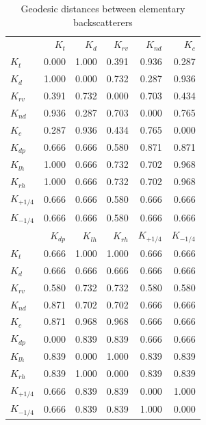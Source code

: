 \documentclass[conference]{IEEEtran}
\begin{document}
\begin{table}[hbt]
\centering
\caption{Geodesic distances between elementary backscatterers}\label{tab:dist_matrix}
\begin{tabular}{lrrrrr}
\toprule
& $K_{t}$ & $K_{d}$ & $K_{rv}$ & $K_{nd}$ & $K_{c}$\\
\cmidrule(lr){2-6}
$K_{t}$ & 0.000 & 1.000 & 0.391 & 0.936 & 0.287\\
$K_{d}$ & 1.000 & 0.000 & 0.732 & 0.287 & 0.936\\
$K_{rv}$ & 0.391 & 0.732 & 0.000 & 0.703 & 0.434\\
$K_{nd}$ & 0.936 & 0.287 & 0.703 & 0.000 & 0.765\\
$K_{c}$ & 0.287 & 0.936 & 0.434 & 0.765 & 0.000\\
$K_{dp}$ & 0.666 & 0.666 & 0.580 & 0.871 & 0.871\\
$K_{lh}$ & 1.000 & 0.666 & 0.732 & 0.702 & 0.968\\
$K_{rh}$ & 1.000 & 0.666 & 0.732 & 0.702 & 0.968\\
$K_{+1/4}$ & 0.666 & 0.666 & 0.580 & 0.666 & 0.666\\
$K_{-1/4}$ & 0.666 & 0.666 & 0.580 & 0.666 & 0.666\\
\midrule
& $K_{dp}$ & $K_{lh}$ & $K_{rh}$ & $K_{+1/4}$ & $K_{-1/4}$\\
\cmidrule(lr){2-6}
$K_{t}$ & 0.666 & 1.000 & 1.000 & 0.666 & 0.666\\
$K_{d}$ & 0.666 & 0.666 & 0.666 & 0.666 & 0.666\\
$K_{rv}$ & 0.580 & 0.732 & 0.732 & 0.580 & 0.580\\
$K_{nd}$ & 0.871 & 0.702 & 0.702 & 0.666 & 0.666\\
$K_{c}$ & 0.871 & 0.968 & 0.968 & 0.666 & 0.666\\
$K_{dp}$ & 0.000 & 0.839 & 0.839 & 0.666 & 0.666\\
$K_{lh}$ & 0.839 & 0.000 & 1.000 & 0.839 & 0.839\\
$K_{rh}$ & 0.839 & 1.000 & 0.000 & 0.839 & 0.839\\
$K_{+1/4}$ & 0.666 & 0.839 & 0.839 & 0.000 & 1.000\\
$K_{-1/4}$ & 0.666 & 0.839 & 0.839 & 1.000 & 0.000\\
\bottomrule
\end{tabular} 
\end{table}
\end{document}
